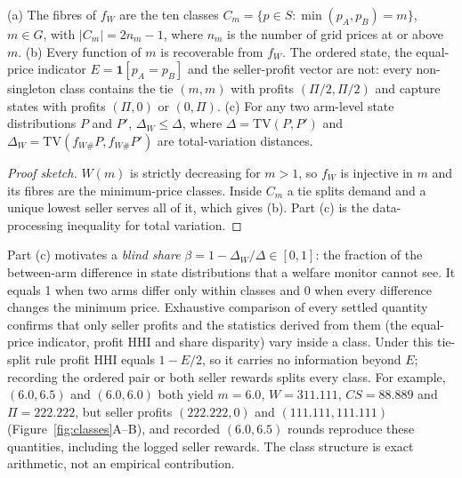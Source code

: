 \documentclass[sigconf,review,anonymous]{acmart}
\begin{document}
\begin{proposition}\label{prop:classes}
(a) The fibres of $f_W$ are the ten classes $C_m=\{p\in S:\min(p_A,p_B)=m\}$, $m\in G$, with $|C_m|=2n_m-1$, where $n_m$ is the number of grid prices at or above $m$.
(b) Every function of $m$ is recoverable from $f_W$. The ordered state, the equal-price indicator $E=\mathbf{1}[p_A=p_B]$ and the seller-profit vector are not: every non-singleton class contains the tie $(m,m)$ with profits $(\Pi/2,\Pi/2)$ and capture states with profits $(\Pi,0)$ or $(0,\Pi)$.
(c) For any two arm-level state distributions $P$ and $P'$, $\Delta_W\le\Delta$, where $\Delta=\mathrm{TV}(P,P')$ and $\Delta_W=\mathrm{TV}(f_{W\#}P,f_{W\#}P')$ are total-variation distances.
\end{proposition}

\begin{proof}[Proof sketch]
$W(m)$ is strictly decreasing for $m>1$, so $f_W$ is injective in $m$ and its fibres are the minimum-price classes. Inside $C_m$ a tie splits demand and a unique lowest seller serves all of it, which gives (b). Part (c) is the data-processing inequality for total variation.
\end{proof}

Part (c) motivates a \emph{blind share} $\beta=1-\Delta_W/\Delta\in[0,1]$: the fraction of the between-arm difference in state distributions that a welfare monitor cannot see. It equals 1 when two arms differ only within classes and 0 when every difference changes the minimum price. Exhaustive comparison of every settled quantity confirms that only seller profits and the statistics derived from them (the equal-price indicator, profit HHI and share disparity) vary inside a class. Under this tie-split rule profit HHI equals $1-E/2$, so it carries no information beyond $E$; recording the ordered pair or both seller rewards splits every class. For example, $(6.0,6.5)$ and $(6.0,6.0)$ both yield $m=6.0$, $W=311.111$, $CS=88.889$ and $\Pi=222.222$, but seller profits $(222.222,0)$ and $(111.111,111.111)$ (Figure~\ref{fig:classes}A--B), and recorded $(6.0,6.5)$ rounds reproduce these quantities, including the logged seller rewards. The class structure is exact arithmetic, not an empirical contribution.
\end{document}
